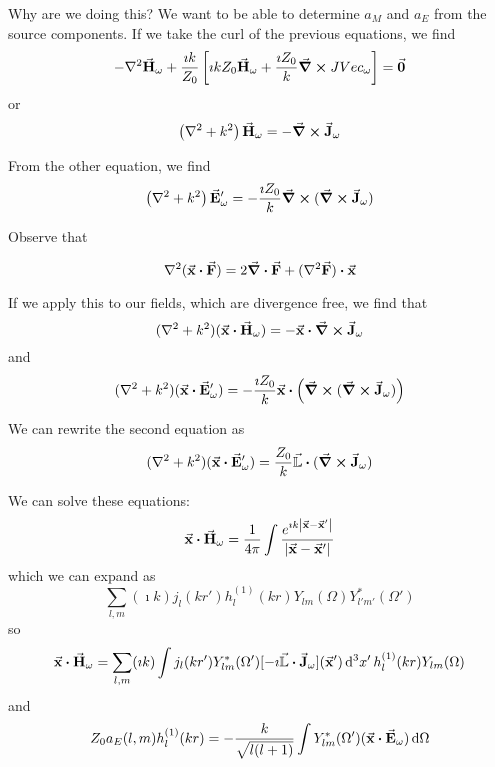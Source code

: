 \documentclass[a4paper,twoside,master.tex]{subfiles}
\begin{document}
Why are we doing this? We want to be able to determine $ a_M $ and $ a_E $ from the source components. If we take the curl of the previous equations, we find
\begin{equation}
    - \laplacian{ \va{H}_{\omega}} + \frac{\imath k}{Z_0} \left[ \imath k Z_0 \va{H}_{\omega} + \frac{\imath Z_0}{k} \curl{ J Vec_{\omega}} \right] = \va{0}
\end{equation}
or
\begin{equation}
    \left( \laplacian + k^2 \right) \va{H}_{\omega} = - \curl{ \va{J}_{\omega}}
\end{equation}

From the other equation, we find
\begin{equation}
    \left( \laplacian + k^2 \right) \va{E}_{\omega}' = - \frac{\imath Z_0}{k} \curl{(\curl{ \va{J}_{\omega}})}
\end{equation}

Observe that
\begin{lemma}
    \begin{equation}
        \laplacian{( \va{x} \vdot \va{F})} = 2 \div{ \va{F}} + (\laplacian{ \va{F}}) \vdot \va{x} 
    \end{equation}
\end{lemma}
If we apply this to our fields, which are divergence free, we find that
\begin{equation}
    (\laplacian + k^2)( \va{x} \vdot \va{H}_{\omega}) = - \va{x} \vdot \curl{ \va{J}_{\omega}}
\end{equation}
and
\begin{equation}
    (\laplacian + k^2)( \va{x} \vdot \va{E}_{\omega}') = - \frac{\imath Z_0}{k} \va{x} \vdot \left( \curl{(\curl{ \va{J}_{\omega}})} \right)
\end{equation}

We can rewrite the second equation as
\begin{equation}
    (\laplacian + k^2)( \va{x} \vdot \va{E}'_{\omega}) = \frac{Z_0}{k} \va{\mathbb{L}} \vdot (\curl{ \va{J}_{\omega}})
\end{equation}

We can solve these equations:
\begin{equation}
    \va{x} \vdot \va{H}_{\omega} = \frac{1}{4 \pi} \int \frac{e^{\imath k \abs{ \va{x} - \va{x}'}}}{\abs{ \va{x} - \va{x}'}}
\end{equation}
which we can expand as
\begin{equation}
    \sum_{l,m} (\imath k) j_l(kr') h_l^{(1)}(kr) Y_{lm}(\Omega) Y_{l'm'}^*(\Omega')
\end{equation}
so
\begin{equation}
    \va{x} \vdot \va{H}_{\omega} = \sum_{l,m} (\imath k) \int j_l(kr') Y_{lm}^*(\Omega') [- \imath \va{\mathbb{L}} \vdot \va{J}_{\omega}] ( \va{x}') \dd[3]{x'} h_l^{(1)}(kr) Y_{lm}(\Omega) 
\end{equation}
and
\begin{equation}
    Z_0 a_E(l,m) h_l^{(1)}(kr) = - \frac{k}{\sqrt{l(l+1)}} \int Y_{lm}^*(\Omega') ( \va{x} \vdot \va{E}_{\omega}) \dd{\Omega}
\end{equation}
\end{document}
